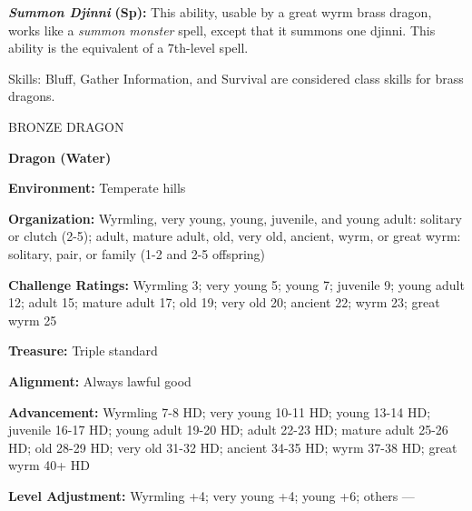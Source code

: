 \documentclass{article}
\begin{document}
\textit{\textbf{Summon Djinni }}\textbf{(Sp):} This ability, usable by a great 
wyrm brass dragon, works like a \textit{summon monster }spell, except that it summons 
one djinni. This ability is the equivalent of a 7th-level spell. 

Skills: Bluff, Gather Information, and Survival are considered class skills for 
brass dragons.

\vspace{12pt}
BRONZE DRAGON

\textbf{Dragon (Water)}

\textbf{Environment:} Temperate hills

\textbf{Organization:} Wyrmling, very young, young, juvenile, and young adult: 
solitary or clutch (2-5); adult, mature adult, old, very old, ancient, wyrm, or 
great wyrm: solitary, pair, or family (1-2 and 2-5 offspring)

\textbf{Challenge Ratings:} Wyrmling 3; very young 5; young 7; juvenile 9; young 
adult 12; adult 15; mature adult 17; old 19; very old 20; ancient 22; wyrm 23; 
great wyrm 25

\textbf{Treasure:} Triple standard

\textbf{Alignment:} Always lawful good

\textbf{Advancement:} Wyrmling 7-8 HD; very young 10-11 HD; young 13-14 HD; juvenile 
16-17 HD; young adult 19-20 HD; adult 22-23 HD; mature adult 25-26 HD; old 28-29 
HD; very old 31-32 HD; ancient 34-35 HD; wyrm 37-38 HD; great wyrm 40+ HD

\textbf{Level Adjustment:} Wyrmling +4; very young +4; young +6; others ---

\vspace{12pt}
\end{document}
